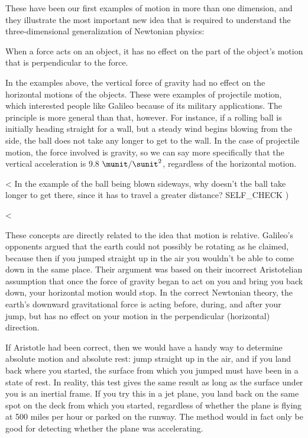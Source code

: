 These have been our first examples of motion in more than
one dimension, and they illustrate the most important new
idea that is required to understand the three-dimensional
generalization of Newtonian physics:

\begin{important}
When a force acts on an object, it has no effect on the part
of the object's motion that is perpendicular to the force.
\end{important}

\noindent In the examples above, the vertical force of gravity had no
effect on the horizontal motions of the objects. These were
examples of projectile motion, which interested people like
Galileo because of its military applications. The principle
is more general than that, however. For instance, if a
rolling ball is initially heading straight for a wall, but a
steady wind begins blowing from the side, the ball does not
take any longer to get to the wall. In the case of
projectile motion, the force involved is gravity, so we can
say more specifically that the vertical acceleration is 9.8
$\munit/\sunit^2$, regardless of the horizontal motion.

<%
In the example of the ball being blown sideways, why doesn't
the ball take longer to get there, since it has to
travel a greater distance?
  SELF_CHECK
  ) %

\enlargethispage{-\baselineskip}


<%

These concepts are directly related to the idea that motion
is relative. Galileo's opponents argued that the earth could
not possibly be rotating as he claimed, because then if you
jumped straight up in the air you wouldn't be able to come
down in the same place. Their argument was based on their
incorrect Aristotelian assumption that once the force of
gravity began to act on you and bring you back down, your
horizontal motion would stop. In the correct Newtonian
theory, the earth's downward gravitational force is acting
before, during, and after your jump, but has no effect on
your motion in the perpendicular (horizontal) direction.

If Aristotle had been correct, then we would have a handy
way to determine absolute motion and absolute rest: jump
straight up in the air, and if you land back where you
started, the surface from which you jumped must have been in
a state of rest. In reality, this test gives the same result
as long as the surface under you is an inertial frame. If
you try this in a jet plane, you land back on the same spot
on the deck from which you started, regardless of whether
the plane is flying at 500 miles per hour or parked on the
runway. The method would in fact only be good for detecting
whether the plane was accelerating.

